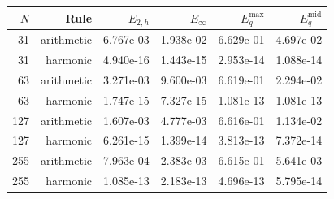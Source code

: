 \begin{tabular}{rrrrrr}
\toprule
$N$ & Rule & $E_{2,h}$ & $E_\infty$ & $E_q^{\max}$ & $E_q^{\mathrm{mid}}$\\
\midrule
31 & arithmetic & 6.767e-03 & 1.938e-02 & 6.629e-01 & 4.697e-02\\
31 & harmonic & 4.940e-16 & 1.443e-15 & 2.953e-14 & 1.088e-14\\
63 & arithmetic & 3.271e-03 & 9.600e-03 & 6.619e-01 & 2.294e-02\\
63 & harmonic & 1.747e-15 & 7.327e-15 & 1.081e-13 & 1.081e-13\\
127 & arithmetic & 1.607e-03 & 4.777e-03 & 6.616e-01 & 1.134e-02\\
127 & harmonic & 6.261e-15 & 1.399e-14 & 3.813e-13 & 7.372e-14\\
255 & arithmetic & 7.963e-04 & 2.383e-03 & 6.615e-01 & 5.641e-03\\
255 & harmonic & 1.085e-13 & 2.183e-13 & 4.696e-13 & 5.795e-14\\
\bottomrule
\end{tabular}
